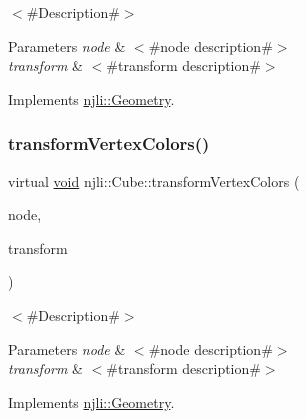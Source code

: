 $<$\#\+Description\#$>$


\begin{DoxyParams}{Parameters}
{\em node} & $<$\#node description\#$>$ \\
\hline
{\em transform} & $<$\#transform description\#$>$ \\
\hline
\end{DoxyParams}


Implements \mbox{\hyperlink{classnjli_1_1_geometry_a8ffb29f40c6f175f83cc36568feb87c4}{njli\+::\+Geometry}}.

\mbox{\label{classnjli_1_1_cube_a2a2d30322a9d48d0521fedbba3072a80}} 
\subsubsection{\texorpdfstring{transform\+Vertex\+Colors()}{transformVertexColors()}}
{\footnotesize\ttfamily virtual \mbox{\hyperlink{_thread_8h_af1e856da2e658414cb2456cb6f7ebc66}{void}} njli\+::\+Cube\+::transform\+Vertex\+Colors (\begin{DoxyParamCaption}\item[{\mbox{\hyperlink{classnjli_1_1_node}{Node}} $\ast$}]{node,  }\item[{const bt\+Transform \&}]{transform }\end{DoxyParamCaption})\hspace{0.3cm}{\ttfamily [virtual]}}

$<$\#\+Description\#$>$


\begin{DoxyParams}{Parameters}
{\em node} & $<$\#node description\#$>$ \\
\hline
{\em transform} & $<$\#transform description\#$>$ \\
\hline
\end{DoxyParams}


Implements \mbox{\hyperlink{classnjli_1_1_geometry_a1169257a4241392cec0a23c922f148f3}{njli\+::\+Geometry}}.

\mbox{\label{classnjli_1_1_cube_ad3a57659a9ad27cbd21254db444ac49f}} 
